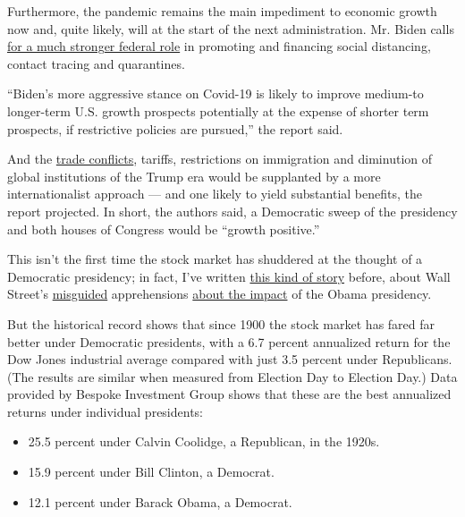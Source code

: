 Furthermore, the pandemic remains the main impediment to economic growth
now and, quite likely, will at the start of the next administration. Mr.
Biden calls
\href{https://www.nytimes3xbfgragh.onion/2020/05/28/us/politics/biden-trump-coronavirus-testing.html}{for
a much stronger federal role} in promoting and financing social
distancing, contact tracing and quarantines.

``Biden's more aggressive stance on Covid-19 is likely to improve
medium-to longer-term U.S. growth prospects potentially at the expense
of shorter term prospects, if restrictive policies are pursued,'' the
report said.

And the
\href{https://www.nytimes3xbfgragh.onion/2018/09/21/business/trade-disputes-more-than-a-money-problem.html}{trade
conflicts}, tariffs, restrictions on immigration and diminution of
global institutions of the Trump era would be supplanted by a more
internationalist approach --- and one likely to yield substantial
benefits, the report projected. In short, the authors said, a Democratic
sweep of the presidency and both houses of Congress would be ``growth
positive.''

This isn't the first time the stock market has shuddered at the thought
of a Democratic presidency; in fact, I've written
\href{https://www.nytimes3xbfgragh.onion/2012/10/21/your-money/wall-st-may-not-cheer-but-obamas-been-good-for-stocks.html}{this
kind of story} before, about Wall Street's
\href{https://www.nytimes3xbfgragh.onion/2016/08/21/your-money/the-obama-years-the-best-of-times-to-be-a-stock-investor.html}{misguided}
apprehensions
\href{https://www.nytimes3xbfgragh.onion/2013/08/11/your-money/this-ironman-market-is-still-lacking-respect.html}{about
the impact} of the Obama presidency.

But the historical record shows that since 1900 the stock market has
fared far better under Democratic presidents, with a 6.7 percent
annualized return for the Dow Jones industrial average compared with
just 3.5 percent under Republicans. (The results are similar when
measured from Election Day to Election Day.) Data provided by Bespoke
Investment Group shows that these are the best annualized returns under
individual presidents:

\begin{itemize}
\item
  25.5 percent under Calvin Coolidge, a Republican, in the 1920s.
\item
  15.9 percent under Bill Clinton, a Democrat.
\item
  12.1 percent under Barack Obama, a Democrat.
\end{itemize}

